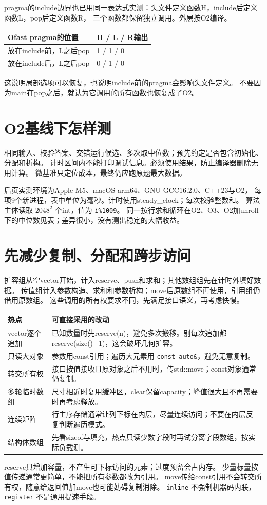 pragma的include边界也已用同一表达式实测：头文件定义函数H，include后定义函数L，pop后定义函数R，
三个函数都保留独立调用。外层按O2编译。
\begin{longtable}{p{89mm}p{70mm}}\toprule Ofast pragma的位置 & H / L / R输出\\\midrule\endhead
放在include前，L之后pop & 1 / 1 / 0\\
放在include后，L之后pop & 0 / 1 / 0\\\bottomrule
\end{longtable}
这说明局部选项可以恢复，也说明include前的pragma会影响头文件定义。
不要因为main在pop之后，就认为它调用的所有函数也恢复成了O2。

\section{O2基线下怎样测}
相同输入、校验答案、交错运行候选、多次取中位数；预先约定是否包含初始化、分配和析构。
计时区间内不能打印调试信息。必须使用结果，防止编译器删除无用计算。
微基准只定位成本，最终仍应跑原题最大数据。

后页实测环境为Apple M5、macOS arm64、GNU GCC16.2.0、C++23与O2，
每项9个新进程，表中单位为毫秒。计时使用steady\_clock；每次校验整数和。
算法主体读取 $2048^2$ 个int，值为 \texttt{i\%1009}。
同一按行求和循环在O2、O3、O2加unroll下的中位数见表；差异很小，没有测出稳定的大幅收益。


\newpage
\section{先减少复制、分配和跨步访问}

扩容组从空vector开始，计入reserve、push和求和；其他数组组先在计时外填好数据。
传值组计入参数构造、求和和参数析构；move后原数组不再使用，引用组仍借用原数组。
这些调用的所有权要求不同，先满足接口语义，再考虑快慢。

\begin{longtable}{p{42mm}p{117mm}}\toprule 热点 & 可直接采用的改动\\\midrule\endhead
vector逐个追加 & 已知数量时先reserve(n)，避免多次搬移。别每次追加都reserve(size()+1)，这会破坏几何扩容。\\
只读大对象 & 参数用const引用；遍历大元素用 \texttt{const auto\&}，避免无意复制。\\
转交所有权 & 接口按值接收且原对象之后不用时，传std::move；const对象通常仍复制。\\
多轮临时数组 & 尺寸相近时复用缓冲区，clear保留capacity；峰值很大且不再需要时再考虑释放。\\
连续矩阵 & 行主序存储通常让列下标在内层，尽量连续访问；不要在内层反复判断遍历模式。\\
结构体数组 & 先看sizeof与填充，热点只读少数字段时再试分离字段数组，按实际负载测。\\\bottomrule
\end{longtable}
reserve只增加容量，不产生可下标访问的元素；过度预留会占内存。
少量标量按值传递通常更简单，不能把所有参数都改为引用。
move传给const引用不会转交所有权，随意给返回值加move也可能妨碍复制消除。
\texttt{inline} 不强制机器码内联，\texttt{register} 不是通用提速手段。


